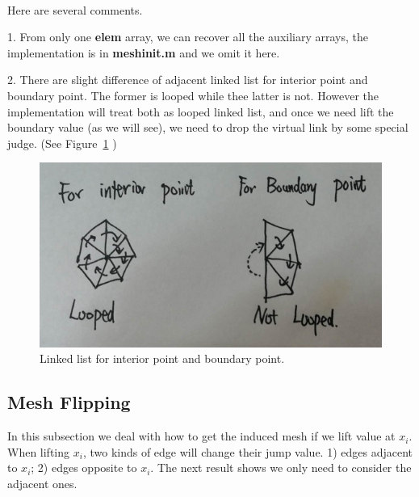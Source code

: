 \documentclass{article}
\begin{document}
~~
~~


Here are several comments.

1. From only one \textbf{elem} array, we can recover all the auxiliary arrays, the implementation is in \textbf{meshinit.m} and we omit it here.

2. There are slight difference of adjacent linked list for interior point and boundary point. The former is looped while thee latter is not. However the implementation will treat both as looped linked list, and once we need lift the boundary value (as we will see), we need to drop the virtual link by some special judge. (See Figure~\ref{fig:all} )

\begin{figure}[H]


	\centering
	\includegraphics[scale=0.3]{../fig/adjlinkedlist.png}
		\caption{Linked list for interior point and boundary point.}
			\label{fig:all}
\end{figure}

\subsection{Mesh Flipping}
In this subsection we deal with how to get the induced mesh if we lift value at $x_i$. When lifting $x_i$, two kinds of edge will change their jump value.  1) edges adjacent to $x_i$; 2) edges opposite to $x_i$. The next result shows we only need to consider the adjacent ones.
\end{document}
